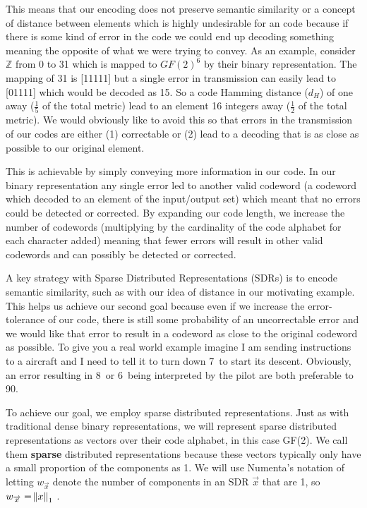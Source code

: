 \documentclass[oneside,12pt,openany]{book}
\begin{document}
	This means that our encoding does not preserve semantic similarity or a concept of distance between elements which is highly undesirable for an code because if there is some kind of error in the code we could end up decoding something meaning the opposite of what we were trying to convey. As an example, consider $\mathbb{Z}$ from 0 to 31 which is mapped to $GF(2)^{6}$ by their binary representation. The mapping of 31 is [11111] but a single error in transmission can easily lead to [01111] which would be decoded as 15. So a code Hamming distance ($d_{H}$) of one away ($\frac{1}{5}$ of the total metric) lead to an element 16 integers away ($\frac{1}{2}$ of the total metric). We would obviously like to avoid this so that errors in the transmission of our codes are either (1) correctable or (2) lead to a decoding that is as close as possible to our original element.
	
	This is achievable by simply conveying more information in our code. In our binary representation any single error led to another valid codeword (a codeword which decoded to an element of the input/output set) which meant that no errors could be detected or corrected. By expanding our code length, we increase the number of codewords (multiplying by the cardinality of the code alphabet for each character added) meaning that fewer errors will result in other valid codewords and can possibly be detected or corrected. 
	
	A key strategy with Sparse Distributed Representations (SDRs) is to encode semantic similarity, such as with our idea of distance in our motivating example. This helps us achieve our second goal because even if we increase the error-tolerance of our code, there is still some probability of an uncorrectable error and we would like that error to result in a codeword as close to the original codeword as possible. To give you a real world example imagine I am sending instructions to a aircraft and I need to tell it to turn down 7\textdegree~to start its descent. Obviously, an error resulting in 8\textdegree~or 6\textdegree~being interpreted by the pilot are both preferable to 90\textdegree.
	
	To achieve our goal, we employ sparse distributed representations. Just as with traditional dense binary representations, we will represent sparse distributed representations as vectors over their code alphabet, in this case GF(2). We call them \textbf{sparse} distributed representations because these vectors typically only have a small proportion of the components as 1. We will use Numenta's notation of letting $w_{\overrightarrow{x}}$ denote the number of components in an SDR $\overrightarrow{x}$ that are 1, so $w_{\overrightarrow{x}} = \norm{x}_{1}$ \cite{Properties}.
	
\end{document}
